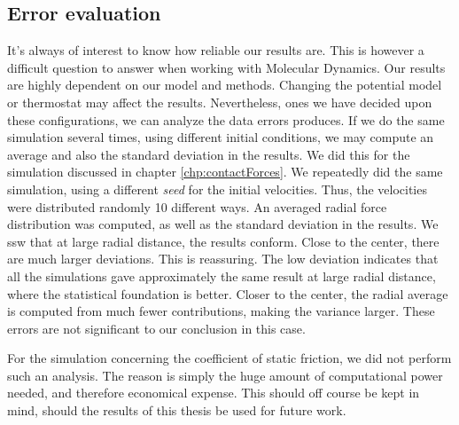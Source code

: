 \documentclass[twoside,english]{uiofysmaster}
\begin{document}
\subsection{Error evaluation}
It's always of interest to know how reliable our results are. 
This is however a difficult question to answer when working with Molecular Dynamics. 
Our results are highly dependent on our model and methods. 
Changing the potential model or thermostat may affect the results.
Nevertheless, ones we have decided upon these configurations, we can analyze the data errors produces.
If we do the same simulation several times, using different initial conditions, we may compute an average and also the standard deviation in the results.
We did this for the simulation discussed in chapter \ref{chp:contactForces}. 
We repeatedly did the same simulation, using a different \textit{seed} for the initial velocities. 
Thus, the velocities were distributed randomly 10 different ways. 
An averaged radial force distribution was computed, as well as the standard deviation in the results. 
We ssw that at large radial distance, the results conform. 
Close to the center, there are much larger deviations. 
This is reassuring. 
The low deviation indicates that all the simulations gave approximately the same result at large radial distance, where the statistical foundation is better. 
Closer to the center, the radial average is computed from much fewer contributions, making the variance larger. 
These errors are not significant to our conclusion in this case.

For the simulation concerning the coefficient of static friction, we did not perform such an analysis. 
The reason is simply the huge amount of computational power needed, and therefore economical expense. 
This should off course be kept in mind, should the results of this thesis be used for future work.
%   
\end{document}
